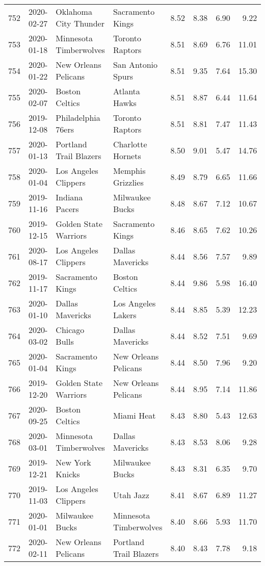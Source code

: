 \documentclass[
  11pt,
]{article}
\theoremstyle{nonumberplain}
\begin{document}
\begin{longtable}{rl|llr|rrr}
752 & 2020-02-27 & Oklahoma City Thunder & Sacramento Kings & 8.52 & 8.38 & 6.90 & 9.22\\
753 & 2020-01-18 & Minnesota Timberwolves & Toronto Raptors & 8.51 & 8.69 & 6.76 & 11.01\\
754 & 2020-01-22 & New Orleans Pelicans & San Antonio Spurs & 8.51 & 9.35 & 7.64 & 15.30\\
755 & 2020-02-07 & Boston Celtics & Atlanta Hawks & 8.51 & 8.87 & 6.44 & 11.64\\
756 & 2019-12-08 & Philadelphia 76ers & Toronto Raptors & 8.51 & 8.81 & 7.47 & 11.43\\
757 & 2020-01-13 & Portland Trail Blazers & Charlotte Hornets & 8.50 & 9.01 & 5.47 & 14.76\\
758 & 2020-01-04 & Los Angeles Clippers & Memphis Grizzlies & 8.49 & 8.79 & 6.65 & 11.66\\
759 & 2019-11-16 & Indiana Pacers & Milwaukee Bucks & 8.48 & 8.67 & 7.12 & 10.67\\
760 & 2019-12-15 & Golden State Warriors & Sacramento Kings & 8.46 & 8.65 & 7.62 & 10.26\\
761 & 2020-08-17 & Los Angeles Clippers & Dallas Mavericks & 8.44 & 8.56 & 7.57 & 9.89\\
762 & 2019-11-17 & Sacramento Kings & Boston Celtics & 8.44 & 9.86 & 5.98 & 16.40\\
763 & 2020-01-10 & Dallas Mavericks & Los Angeles Lakers & 8.44 & 8.85 & 5.39 & 12.23\\
764 & 2020-03-02 & Chicago Bulls & Dallas Mavericks & 8.44 & 8.52 & 7.51 & 9.69\\
765 & 2020-01-04 & Sacramento Kings & New Orleans Pelicans & 8.44 & 8.50 & 7.96 & 9.20\\
766 & 2019-12-20 & Golden State Warriors & New Orleans Pelicans & 8.44 & 8.95 & 7.14 & 11.86\\
767 & 2020-09-25 & Boston Celtics & Miami Heat & 8.43 & 8.80 & 5.43 & 12.63\\
768 & 2020-03-01 & Minnesota Timberwolves & Dallas Mavericks & 8.43 & 8.53 & 8.06 & 9.28\\
769 & 2019-12-21 & New York Knicks & Milwaukee Bucks & 8.43 & 8.31 & 6.35 & 9.70\\
770 & 2019-11-03 & Los Angeles Clippers & Utah Jazz & 8.41 & 8.67 & 6.89 & 11.27\\
771 & 2020-01-01 & Milwaukee Bucks & Minnesota Timberwolves & 8.40 & 8.66 & 5.93 & 11.70\\
772 & 2020-02-11 & New Orleans Pelicans & Portland Trail Blazers & 8.40 & 8.43 & 7.78 & 9.18\\

\end{longtable}
\end{document}
